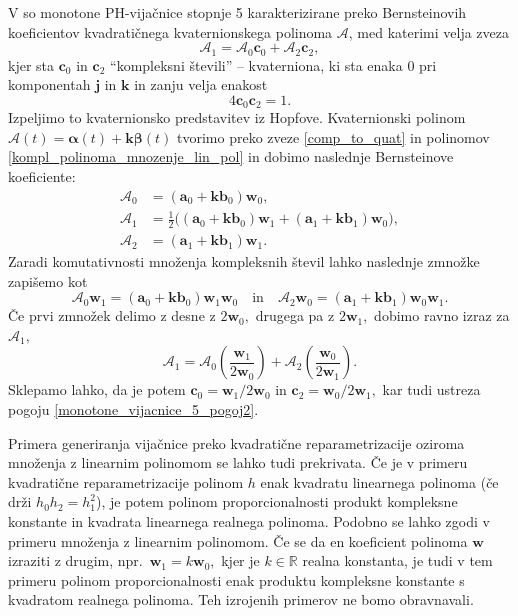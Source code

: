\documentclass[12pt,a4paper,twoside]{article}
\theoremstyle{definition} %
\theoremstyle{plain} %
\theoremstyle{primerstyle}
\numberwithin{equation}{section}  %
\newcommand{\R}{\mathbb R}
\newcommand{\aV}{\mathbf{a}}
\newcommand{\bV}{\mathbf{b}}
\newcommand{\cV}{\mathbf{c}}
\newcommand{\jV}{\mathbf{j}}
\newcommand{\kV}{\mathbf{k}}
\newcommand{\wV}{\mathbf{w}}
\newcommand{\AQ}{\mathcal{A}}
\newcommand{\balpha}{\boldsymbol \alpha}
\newcommand{\bbeta}{\boldsymbol \beta}
\begin{document}
V \cite[str.\ 390]{faroukietal2004} so monotone PH-vijačnice stopnje 5 karakterizirane preko Bernsteinovih koeficientov kvadratičnega kvaternionskega polinoma $\AQ$, med katerimi velja zveza
\begin{equation}
	\label{monotone_vijacnice_5_pogoj}
	\AQ_1=\AQ_0\cV_0+\AQ_2\cV_2,
\end{equation}
kjer sta $\cV_0$ in $\cV_2$ ``kompleksni števili'' -- kvaterniona, ki sta enaka 0 pri komponentah $\jV$ in $\kV$ in zanju velja enakost
\begin{equation}
	\label{monotone_vijacnice_5_pogoj2}
	4\cV_0\cV_2=1.
\end{equation}
Izpeljimo to kvaternionsko predstavitev iz Hopfove. Kvaternionski polinom $\AQ(t)=\balpha(t)+\kV\bbeta(t)$ tvorimo preko zveze \eqref{comp_to_quat} in polinomov \eqref{kompl_polinoma_mnozenje_lin_pol} in dobimo naslednje Bernsteinove koeficiente:
\begin{align*}
	\AQ_0&=(\aV_0+\kV\bV_0)\wV_0,\\
	\AQ_1&=\frac{1}{2}\big((\aV_0+\kV\bV_0)\wV_1+(\aV_1+\kV\bV_1)\wV_0\big),\\
	\AQ_2&=(\aV_1+\kV\bV_1)\wV_1.
\end{align*}
Zaradi komutativnosti množenja kompleksnih števil lahko naslednje zmnožke zapišemo kot
\begin{equation*}
	\AQ_0\wV_1=(\aV_0+\kV\bV_0)\wV_1\wV_0\quad\text{in}\quad\AQ_2\wV_0=(\aV_1+\kV\bV_1)\wV_0\wV_1.
\end{equation*}
Če prvi zmnožek delimo z desne z $2\wV_0,$ drugega pa z $2\wV_1,$ dobimo ravno izraz za $\AQ_1,$
\begin{equation*}
	\AQ_1=\AQ_0\left(\frac{\wV_1}{2\wV_0}\right)+\AQ_2\left(\frac{\wV_0}{2\wV_1}\right)\!.
\end{equation*}
Sklepamo lahko, da je potem $\cV_0=\wV_1/2\wV_0$ in $\cV_2=\wV_0/2\wV_1,$ kar tudi ustreza pogoju \eqref{monotone_vijacnice_5_pogoj2}.

Primera generiranja vijačnice preko kvadratične reparametrizacije oziroma množenja z linearnim polinomom se lahko tudi prekrivata. Če je v primeru kvadratične reparametrizacije polinom $h$ enak kvadratu linearnega polinoma (če drži $h_0h_2=h_1^2$), je potem polinom proporcionalnosti produkt kompleksne konstante in kvadrata linearnega realnega polinoma. Podobno se lahko zgodi v primeru množenja z linearnim polinomom. Če se da en koeficient polinoma $\wV$ izraziti z drugim, npr.\ $\wV_1=k\wV_0,$ kjer je $k\in\R$ realna konstanta, je tudi v tem primeru polinom proporcionalnosti enak produktu kompleksne konstante s kvadratom realnega polinoma. Teh izrojenih primerov ne bomo obravnavali.
\end{document}
